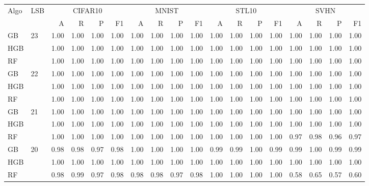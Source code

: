 \documentclass{IEEEtran}
\begin{document}
\begin{table}[th]
\centering
\begin{adjustbox}{width=\textwidth}
\begin{tabular}{| l | l | rrrr | rrrr | rrrr | rrrr |}
\hline
\multirow{2}{*}{Algo} & \multirow{2}{*}{LSB} & \multicolumn{4}{|c|}{CIFAR10} & \multicolumn{4}{|c|}{MNIST} & \multicolumn{4}{|c|}{STL10} & \multicolumn{4}{|c|}{SVHN} \\
 &  & A & R & P & F1 & A & R & P & F1 & A & R & P & F1 & A & R & P & F1 \\
\hline
GB & \multirow{3}{*}{23} & 1.00 & 1.00 & 1.00 & 1.00 & 1.00 & 1.00 & 1.00 & 1.00 & 1.00 & 1.00 & 1.00 & 1.00 & 1.00 & 1.00 & 1.00 & 1.00 \\
HGB &   & 1.00 & 1.00 & 1.00 & 1.00 & 1.00 & 1.00 & 1.00 & 1.00 & 1.00 & 1.00 & 1.00 & 1.00 & 1.00 & 1.00 & 1.00 & 1.00 \\
RF &   & 1.00 & 1.00 & 1.00 & 1.00 & 1.00 & 1.00 & 1.00 & 1.00 & 1.00 & 1.00 & 1.00 & 1.00 & 1.00 & 1.00 & 1.00 & 1.00 \\ \hline
GB & \multirow{3}{*}{22} & 1.00 & 1.00 & 1.00 & 1.00 & 1.00 & 1.00 & 1.00 & 1.00 & 1.00 & 1.00 & 1.00 & 1.00 & 1.00 & 1.00 & 1.00 & 1.00 \\
HGB &   & 1.00 & 1.00 & 1.00 & 1.00 & 1.00 & 1.00 & 1.00 & 1.00 & 1.00 & 1.00 & 1.00 & 1.00 & 1.00 & 1.00 & 1.00 & 1.00 \\
RF &   & 1.00 & 1.00 & 1.00 & 1.00 & 1.00 & 1.00 & 1.00 & 1.00 & 1.00 & 1.00 & 1.00 & 1.00 & 1.00 & 1.00 & 1.00 & 1.00 \\ \hline
GB & \multirow{3}{*}{21} & 1.00 & 1.00 & 1.00 & 1.00 & 1.00 & 1.00 & 1.00 & 1.00 & 1.00 & 1.00 & 1.00 & 1.00 & 1.00 & 1.00 & 1.00 & 1.00 \\
HGB &   & 1.00 & 1.00 & 1.00 & 1.00 & 1.00 & 1.00 & 1.00 & 1.00 & 1.00 & 1.00 & 1.00 & 1.00 & 1.00 & 1.00 & 1.00 & 1.00 \\
RF &   & 1.00 & 1.00 & 1.00 & 1.00 & 1.00 & 1.00 & 1.00 & 1.00 & 1.00 & 1.00 & 1.00 & 1.00 & 0.97 & 0.98 & 0.96 & 0.97 \\ \hline
GB & \multirow{3}{*}{20} & 0.98 & 0.98 & 0.97 & 0.98 & 1.00 & 1.00 & 1.00 & 1.00 & 0.99 & 0.99 & 1.00 & 0.99 & 0.99 & 1.00 & 0.99 & 0.99 \\
HGB &   & 1.00 & 1.00 & 1.00 & 1.00 & 1.00 & 1.00 & 1.00 & 1.00 & 1.00 & 1.00 & 1.00 & 1.00 & 1.00 & 1.00 & 1.00 & 1.00 \\
RF &   & 0.98 & 0.99 & 0.97 & 0.98 & 0.98 & 0.98 & 0.97 & 0.98 & 1.00 & 1.00 & 1.00 & 1.00 & 0.58 & 0.65 & 0.57 & 0.60 \\ \hline

\end{tabular}
\end{adjustbox}
\end{table}
\end{document}
